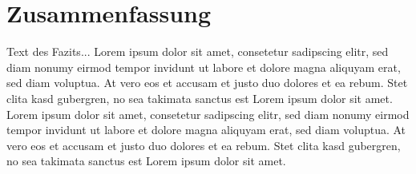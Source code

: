 \section{Zusammenfassung}\label{Zusammenfassung}

Text des Fazits... Lorem ipsum dolor sit amet, consetetur sadipscing elitr, sed diam nonumy eirmod tempor invidunt ut labore et dolore magna aliquyam erat, sed diam voluptua. At vero eos et accusam et justo duo dolores et ea rebum. Stet clita kasd gubergren, no sea takimata sanctus est Lorem ipsum dolor sit amet. Lorem ipsum dolor sit amet, consetetur sadipscing elitr, sed diam nonumy eirmod tempor invidunt ut labore et dolore magna aliquyam erat, sed diam voluptua. At vero eos et accusam et justo duo dolores et ea rebum. Stet clita kasd gubergren, no sea takimata sanctus est Lorem ipsum dolor sit amet.

\cite{goodl16}
\cite{doe16}
\cite{goo16}
\cite{roc19}
\cite{ras18}
\cite{sha18}
\cite{fos19}
\cite{kiwe2013}
\cite{Spi2018}
